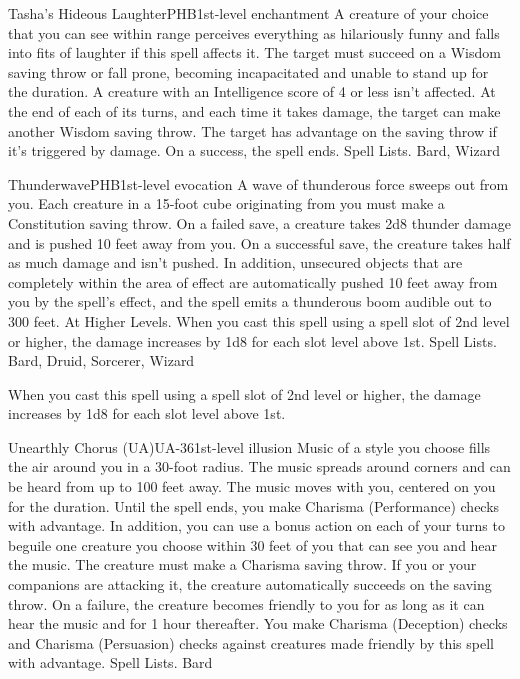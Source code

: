 \begin{spell}{Tasha's Hideous Laughter}{PHB}{1st-level enchantment}
{
}
A creature of your choice that you can see within range perceives everything as hilariously funny and falls into fits of laughter if this spell affects it. The target must succeed on a Wisdom saving throw or fall prone, becoming incapacitated and unable to stand up for the duration. A creature with an Intelligence score of 4 or less isn’t affected.
At the end of each of its turns, and each time it takes damage, the target can make another Wisdom saving throw. The target has advantage on the saving throw if it’s triggered by damage. On a success, the spell ends.
Spell Lists. Bard, Wizard
\end{spell}

\begin{spell}{Thunderwave}{PHB}{1st-level evocation}
{
}
A wave of thunderous force sweeps out from you. Each creature in a 15-foot cube originating from you must make a Constitution saving throw. On a failed save, a creature takes 2d8 thunder damage and is pushed 10 feet away from you. On a successful save, the creature takes half as much damage and isn’t pushed.
In addition, unsecured objects that are completely within the area of effect are automatically pushed 10 feet away from you by the spell’s effect, and the spell emits a thunderous boom audible out to 300 feet.
At Higher Levels. When you cast this spell using a spell slot of 2nd level or higher, the damage increases by 1d8 for each slot level above 1st.
Spell Lists. Bard, Druid, Sorcerer, Wizard

 When you cast this spell using a spell slot of 2nd level or higher, the damage increases by 1d8 for each slot level above 1st.
\end{spell}

\begin{spell}{Unearthly Chorus (UA)}{UA-36}{1st-level illusion}
{
}
Music of a style you choose fills the air around you in a 30-foot radius. The music spreads around corners and can be heard from up to 100 feet away. The music moves with you, centered on you for the duration.
Until the spell ends, you make Charisma (Performance) checks with advantage. In addition, you can use a bonus action on each of your turns to beguile one creature you choose within 30 feet of you that can see you and hear the music. The creature must make a Charisma saving throw. If you or your companions are attacking it, the creature automatically succeeds on the saving throw. On a failure, the creature becomes friendly to you for as long as it can hear the music and for 1 hour thereafter. You make Charisma (Deception) checks and Charisma (Persuasion) checks against creatures made friendly by this spell with advantage.
Spell Lists. Bard
\end{spell}

